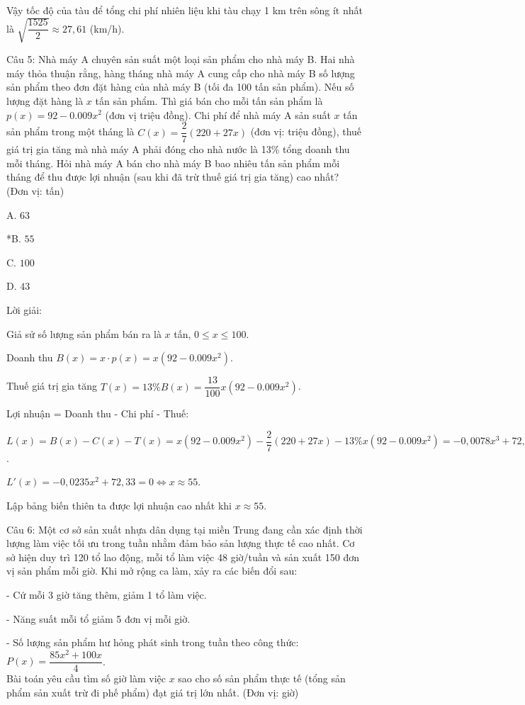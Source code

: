 \documentclass[a4paper,12pt]{article}
\begin{document}
        Vậy tốc độ của tàu để tổng chi phí nhiên liệu khi tàu chạy 1 km trên sông ít nhất là \(\sqrt{\dfrac{1525}{2}} \approx 27,61\) (km/h).




Câu 5: Nhà máy A chuyên sản suất một loại sản phẩm cho nhà máy B. Hai nhà máy thỏa thuận rằng, hàng tháng nhà máy A cung cấp cho nhà máy B số lượng sản phẩm theo đơn đặt hàng của nhà máy B (tối đa 100 tấn sản phẩm). Nếu số lượng đặt hàng là \(x\)  tấn sản phẩm. Thì giá bán cho mỗi tấn sản phẩm là \(p(x)=92-0.009 x^2\) (đơn vị triệu đồng). Chi phí để nhà máy A sản suất \(x\)  tấn sản phẩm trong một tháng là \(C(x)=\dfrac{2}{7}(220+27 x)\) (đơn vị: triệu đồng), thuế giá trị gia tăng mà nhà máy A phải đóng cho nhà nước là 13\% tổng doanh thu mỗi tháng. Hỏi nhà máy A bán cho nhà máy B bao nhiêu tấn sản phẩm mỗi tháng để thu được lợi nhuận (sau khi đã trừ thuế giá trị gia tăng) cao nhất? (Đơn vị: tấn)

A. \(63\)

*B. \(55\)

C. \(100\)

D. \(43\)

Lời giải:


Giả sử số lượng sản phẩm bán ra là \(x\) tấn, \(0 \leq x \leq 100\).

Doanh thu \(B(x) = x \cdot p(x) = x(92 - 0.009x^2)\).

Thuế giá trị gia tăng \(T(x) = 13\% B(x) = \dfrac{13}{100} x(92 - 0.009x^2)\).

Lợi nhuận = Doanh thu - Chi phí - Thuế:

\(L(x) = B(x) - C(x) - T(x) = x(92 - 0.009x^2) - \dfrac{2}{7}(220 + 27x) - 13\% x(92 - 0.009x^2) = -0,0078x^3 + 72,33x + -62,86\).

\(L'(x) = -0,0235x^2 + 72,33 = 0 \Leftrightarrow x \approx 55\).

Lập bảng biến thiên ta được lợi nhuận cao nhất khi \(x \approx 55\).




Câu 6: Một cơ sở sản xuất nhựa dân dụng tại miền Trung đang cần xác định thời lượng làm việc tối ưu trong tuần nhằm đảm bảo sản lượng thực tế cao nhất. Cơ sở hiện duy trì 120 tổ lao động, mỗi tổ làm việc 48 giờ/tuần và sản xuất 150 đơn vị sản phẩm mỗi giờ. Khi mở rộng ca làm, xảy ra các biến đổi sau:

- Cứ mỗi 3 giờ tăng thêm, giảm 1 tổ làm việc.

- Năng suất mỗi tổ giảm 5 đơn vị mỗi giờ.

- Số lượng sản phẩm hư hỏng phát sinh trong tuần theo công thức: \( P(x) = \dfrac{85x^2 + 100x}{4} \).\\Bài toán yêu cầu tìm số giờ làm việc \(x\) sao cho số sản phẩm thực tế (tổng sản phẩm sản xuất trừ đi phế phẩm) đạt giá trị lớn nhất. (Đơn vị: giờ)
\end{document}
